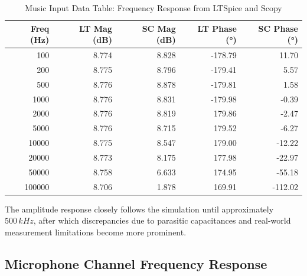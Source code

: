 \documentclass[12pt]{article}
\begin{document}
\begin{table}[H]
	\centering
	\footnotesize
	\caption{Music Input Data Table: Frequency Response from LTSpice and Scopy}
	\label{tab:music_data}
	\renewcommand{\arraystretch}{1}
	\begin{tabular}{|r|r|r|r|r|}
		\hline
		\textbf{Freq (Hz)} & \textbf{LT Mag (dB)} & \textbf{SC Mag (dB)} & \textbf{LT Phase (°)} & \textbf{SC Phase (°)} \\ \hline
		100                & 8.774                & 8.828                & -178.79               & 11.70                 \\ \hline
		200                & 8.775                & 8.796                & -179.41               & 5.57                  \\ \hline
		500                & 8.776                & 8.878                & -179.81               & 1.58                  \\ \hline
		1000               & 8.776                & 8.831                & -179.98               & -0.39                 \\ \hline
		2000               & 8.776                & 8.819                & 179.86                & -2.47                 \\ \hline
		5000               & 8.776                & 8.715                & 179.52                & -6.27                 \\ \hline
		10000              & 8.775                & 8.547                & 179.00                & -12.22                \\ \hline
		20000              & 8.773                & 8.175                & 177.98                & -22.97                \\ \hline
		50000              & 8.758                & 6.633                & 174.95                & -55.18                \\ \hline
		100000             & 8.706                & 1.878                & 169.91                & -112.02               \\ \hline
	\end{tabular}
\end{table}
The amplitude response closely follows the simulation until approximately $500\,kHz$, after which discrepancies due to parasitic capacitances and real-world measurement limitations become more prominent.

\subsection{Microphone Channel Frequency Response}
\end{document}
